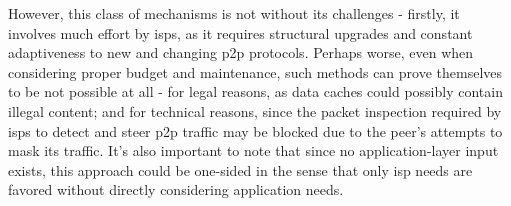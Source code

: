 \begin{itemize}
            However, this class of mechanisms is not without its challenges - firstly, it involves much effort by \glspl{isp}, as it requires structural upgrades and constant adaptiveness to new and changing \gls{p2p} protocols.
            Perhaps worse, even when considering proper budget and maintenance, such methods can prove themselves to be not possible at all - for legal reasons, as data caches could possibly contain illegal content; and for technical reasons, since the packet inspection required by \glspl{isp} to detect and steer \gls{p2p} traffic may be blocked due to the peer's attempts to mask its traffic.
            It's also important to note that since no application-layer input exists, this approach could be one-sided in the sense that only \gls{isp} needs are favored without directly considering application needs.


\end{itemize}
